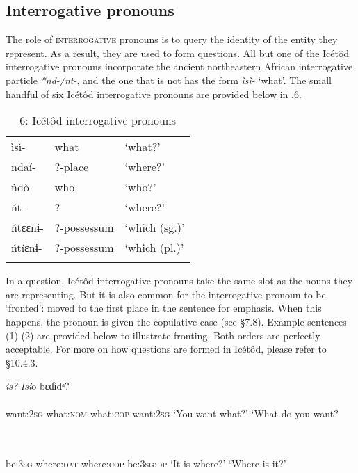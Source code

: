 \subsection{Interrogative pronouns}


The role of \textsc{interrogative} pronouns is to query the identity of the entity they represent. As a result, they are used to form questions. All but one of the Icétôd interrogative pronouns incorporate the ancient northeastern African interrogative particle \textit{*nd-/nt-}, and the one that is not has the form \textit{ìsì-} ‘what’. The small handful of six Icétôd interrogative pronouns are provided below in .6. 


\begin{table}
\caption{6: Icétôd interrogative pronouns}
\label{tab:5}


\begin{tabularx}{\textwidth}{XXX}
\lsptoprule

ìsì- & what & ‘what?’\\
ndaí- & ?-place & ‘where?’\\
ǹdò- & who & ‘who?’\\
ńt- & ? & ‘where?’\\
ńtɛɛnɨ- & ?-possessum & ‘which (sg.)’\\
ńtíɛnɨ- & ?-possessum & ‘which (pl.)’\\
\lspbottomrule
\end{tabularx}
\end{table}
In a question, Icétôd interrogative pronouns take the same slot as the nouns they are representing. But it is also common for the interrogative pronoun to be ‘fronted’: moved to the first place in the sentence for emphasis. When this happens, the pronoun is given the copulative case (see §7.8). Example sentences (1)-(2) are provided below to illustrate fronting. Both orders are perfectly acceptable. For more on how questions are formed in Icétôd, please refer to §10.4.3.




\ea\label{ex:}
   \textit{ìs}\textit{?}      \textit{Isi}o     bɛɗɨdᵃ? \\
    \\
want:\textsc{2sg}   what:\textsc{nom}    what:\textsc{cop}   want:2\textsc{sg}
\glt ‘You want what?’      ‘What do you want? 
\z




\ea\label{ex:}
 \\
    \\
be:\textsc{3sg}   where:\textsc{dat}    where:\textsc{cop}   be:\textsc{3sg:dp}
\glt ‘It is where?’      ‘Where is it?’ 
\z






